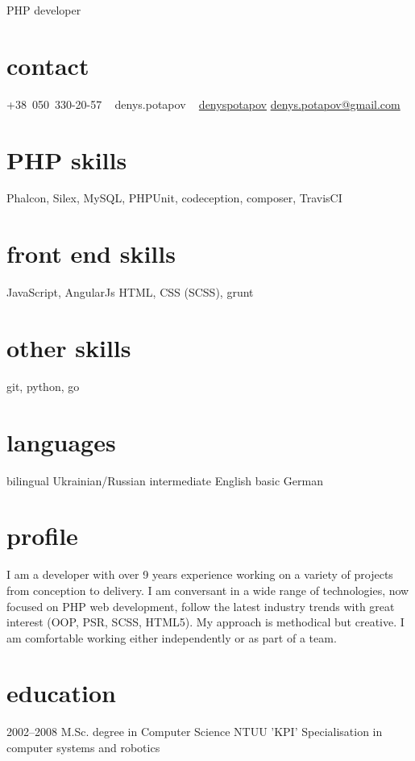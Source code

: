 \documentclass[hidelinks,a4paper]{cv}
\providecommand\faSkype{{\FA\symbol{"F17E}}}
\begin{document}
       {PHP developer}


\begin{aside}
  \section{contact}
     +38~050~330-20-57
     \faSkype~ denys.potapov
     \faLinkedin~ \href{https://www.linkedin.com/in/denyspotapov}{denyspotapov}
     \href{mailto:denys.potapov@gmail.com}{denys.potapov@gmail.com}
  \section{PHP skills}
    Phalcon, Silex, MySQL,
    PHPUnit, codeception,
    composer, TravisCI
  \section{front end skills}
    JavaScript, AngularJs
    HTML, CSS (SCSS), grunt
  \section{other skills}
    git, python, go
  \section{languages}
    bilingual Ukrainian/Russian
    intermediate English
    basic German
\end{aside}

\section{profile}
I am a developer with over 9 years experience working on a variety of projects from conception to delivery. I am conversant in a wide range of technologies, now focused on PHP web development, follow the latest industry trends with great interest (OOP, PSR, SCSS, HTML5). My approach is methodical but creative. I am comfortable working either independently or as part of a team.
\section{education}

\begin{entrylist}
  \entry
    {2002–2008}
    {M.Sc. degree in Computer Science}
    {NTUU 'KPI'}
    {Specialisation in computer systems and robotics}
\end{entrylist}
\end{document}
